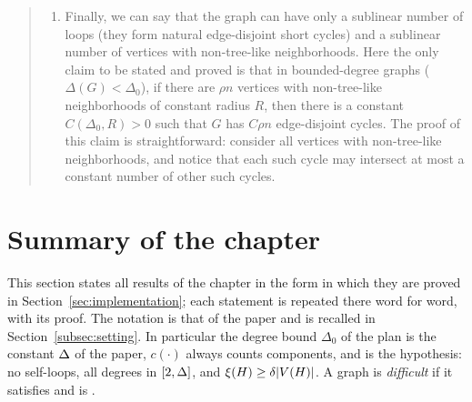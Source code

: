 \documentclass[11pt,a4paper]{article}
\theoremstyle{definition}
\theoremstyle{remark}
\theoremstyle{plain}
\theoremstyle{definition}
\begin{document}
\begin{quote}
\begin{enumerate}[label=\alph*)]
  Then we state the corollary: if a graph has many (linear in \(n\))
  edge-disjoint short cycles and positive excess in every connected
  component, then \(\Pr[\mathrm{SAT}]<e^{-\Omega(n)}\). The proof of this
  corollary is easy: we look at all connected components and consider two
  cases: (i) only one short cycle in the component; (ii) \(\ge2\) short cycles
  in the component. In case (ii) we consider a minimal spanning subgraph
  connecting all those edge-disjoint cycles in the component and apply the
  graph-theoretic lemma. In case (i) we just find one barbell using only
  vertices of the connected component, which are disjoint from all remaining
  vertices. We then do a simple counting argument for the total number of
  edges in the graph and conclude that many of the barbells cannot have very
  long paths (otherwise there would be too many edges).
\item Finally, we can say that the graph can have only a sublinear number of
  loops (they form natural edge-disjoint short cycles) and a sublinear number
  of vertices with non-tree-like neighborhoods. Here the only claim to be
  stated and proved is that in bounded-degree graphs (\(\Delta(G)<\Delta_0\)),
  if there are \(\rho n\) vertices with non-tree-like neighborhoods of constant
  radius \(R\), then there is a constant \(C(\Delta_0,R)>0\) such that \(G\)
  has \(C\rho n\) edge-disjoint cycles. The proof of this claim is
  straightforward: consider all vertices with non-tree-like neighborhoods, and
  notice that each such cycle may intersect at most a constant number of other
  such cycles.
\end{enumerate}
\end{quote}

\section{Summary of the chapter}\label{sec:summary}

This section states all results of the chapter in the form in which they are
proved in Section~\ref{sec:implementation}; each statement is repeated there
word for word, with its proof. The notation is that of the paper and is
recalled in Section~\ref{subsec:setting}. In particular the degree bound
\(\Delta_0\) of the plan is the constant \(\Delta\) of the paper, \(c(\cdot)\)
always counts components, and \Hyp{} is the hypothesis: no self-loops, all
degrees in \([2,\Delta]\), and \(\xi(H)\ge\delta|V(H)|\). A graph is
\emph{difficult} if it satisfies \Hyp{} and is \loctree{\rad}{\nontree}.
\end{document}
